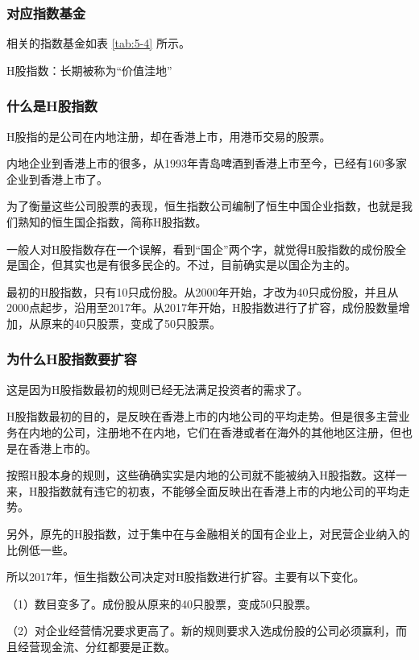 \subsubsection{对应指数基金}

相关的指数基金如表 \ref{tab:5-4} 所示。





{\fangsong H股指数：长期被称为“价值洼地”}

\subsubsection{什么是H股指数}

H股指的是公司在内地注册，却在香港上市，用港币交易的股票。

内地企业到香港上市的很多，从1993年青岛啤酒到香港上市至今，已经有160多家企业到香港上市了。

为了衡量这些公司股票的表现，恒生指数公司编制了恒生中国企业指数，也就是我们熟知的恒生国企指数，简称H股指数。

一般人对H股指数存在一个误解，看到“国企”两个字，就觉得H股指数的成份股全是国企，但其实也是有很多民企的。不过，目前确实是以国企为主的。

最初的H股指数，只有10只成份股。从2000年开始，才改为40只成份股，并且从2000点起步，沿用至2017年。从2017年开始，H股指数进行了扩容，成份股数量增加，从原来的40只股票，变成了50只股票。

\subsubsection{为什么H股指数要扩容}

这是因为H股指数最初的规则已经无法满足投资者的需求了。

H股指数最初的目的，是反映在香港上市的内地公司的平均走势。但是很多主营业务在内地的公司，注册地不在内地，它们在香港或者在海外的其他地区注册，但也是在香港上市的。

按照H股本身的规则，这些确确实实是内地的公司就不能被纳入H股指数。这样一来，H股指数就有违它的初衷，不能够全面反映出在香港上市的内地公司的平均走势。

另外，原先的H股指数，过于集中在与金融相关的国有企业上，对民营企业纳入的比例低一些。

所以2017年，恒生指数公司决定对H股指数进行扩容。主要有以下变化。

（1）数目变多了。成份股从原来的40只股票，变成50只股票。

（2）对企业经营情况要求更高了。新的规则要求入选成份股的公司必须赢利，而且经营现金流、分红都要是正数。

